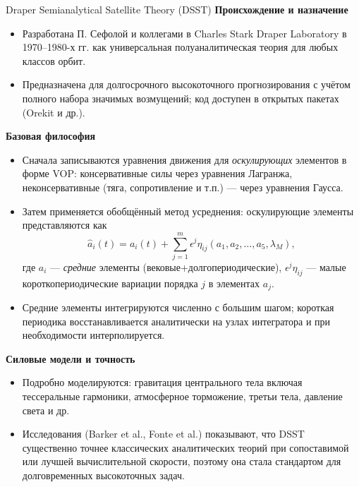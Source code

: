 \documentclass[8pt]{beamer}
\begin{document}
\begin{frame}{Draper Semianalytical Satellite Theory (DSST)}
\textbf{Происхождение и назначение}
\begin{itemize}
    \justifying
  \item Разработана П. Сефолой и коллегами в Charles Stark Draper Laboratory в 1970–1980-х гг. как универсальная полуаналитическая теория для любых классов орбит. 
  \item Предназначена для долгосрочного высокоточного прогнозирования с учётом полного набора значимых возмущений; код доступен в открытых пакетах (Orekit и др.). 
\end{itemize}

\vspace{0.4em}
\textbf{Базовая философия}
\begin{itemize}
    \justifying
  \item Сначала записываются уравнения движения для \emph{оскулирующих} элементов в форме VOP: консервативные силы через уравнения Лагранжа, неконсервативные (тяга, сопротивление и т.п.) — через уравнения Гаусса.
  \item Затем применяется обобщённый метод усреднения: оскулирующие элементы
        представляются как
        \[
          \hat a_i(t) = a_i(t) + \sum_{j=1}^m \epsilon^j \eta_{ij}(a_1, a_2, \dots, a_5, \lambda_M),
        \]
        где $a_i$ — \emph{средние} элементы (вековые+долгопериодические),
        $\epsilon^j \eta_{ij}$ — малые короткопериодические вариации порядка $j$ в элементах $a_j$.
  \item Средние элементы интегрируются численно с большим шагом; короткая периодика восстанавливается аналитически на узлах интегратора и при необходимости интерполируется. 
\end{itemize}

\vspace{0.4em}
\textbf{Силовые модели и точность}
\begin{itemize}
\justifying
  \item Подробно моделируются: гравитация центрального тела включая тессеральные
        гармоники, атмосферное торможение, третьи тела, давление света и др. 
  \item Исследования (Barker et al., Fonte et al.) показывают, что DSST существенно точнее классических аналитических теорий при сопоставимой или лучшей вычислительной скорости, поэтому она стала стандартом для долговременных высокоточных задач. 
\end{itemize}

\end{frame}
\end{document}
